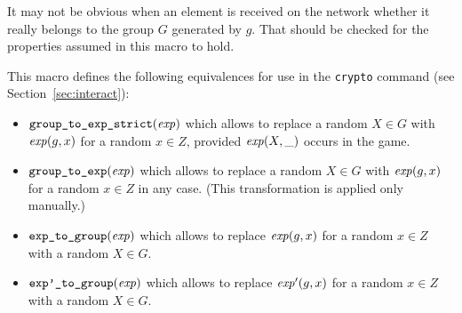 \documentclass{article}
\begin{document}
\begin{itemize}
\begin{itemize}
\begin{itemize}
       It may not be obvious when an element is received on the network
       whether it really belongs to the group $G$ generated by $g$. That should 
       be checked for the properties assumed in this macro to hold.

       This macro defines the following equivalences for use in the
       \texttt{crypto} command (see Section~\ref{sec:interact}):
       \begin{itemize}
       \item $\texttt{group\_to\_exp\_strict}(\mathit{exp})$ which allows to replace
         a random $X \in G$ with $\mathit{exp}(g,x)$ for a random $x \in Z$, provided
         $\mathit{exp}(X,\_)$ occurs in the game.
       \item $\texttt{group\_to\_exp}(\mathit{exp})$ which allows to replace
         a random $X \in G$ with $\mathit{exp}(g,x)$ for a random $x \in Z$ in any case.
         (This transformation is applied only manually.)
       \item $\texttt{exp\_to\_group}(\mathit{exp})$ which allows to replace
         $\mathit{exp}(g,x)$ for a random $x \in Z$ with a random $X \in G$.
       \item $\texttt{exp'\_to\_group}(\mathit{exp})$ which allows to replace
         $\mathit{exp'}(g,x)$ for a random $x \in Z$ with a random $X \in G$.
       \end{itemize}

\newcommand{\F}{\mathbb{F}}%
\newcommand{\red}{\mathrm{red}}%
\newcommand{\repr}{\mathrm{repr}}%
\newcommand{\modop}{\mathbin{\mathrm{mod}}}%
\newcommand{\mul}[2]{{#1}\cdot{#2}}


\end{itemize}
\end{itemize}
\end{itemize}
\end{document}
